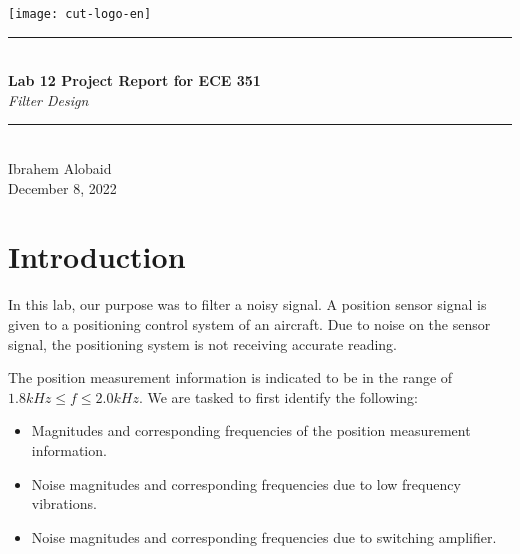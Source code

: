 \documentclass[12pt,a4paper]{article}
\newcommand{\HRule}{\rule{\linewidth}{0.5mm}}
\begin{document}
\begin{titlepage}
\begin{center}
\texttt{[image: cut-logo-en]}~\\[2cm]
\HRule \\[0.4cm]
{ \LARGE 
  \textbf{Lab 12 Project Report for ECE 351}\\[0.4cm]
  \emph{Filter Design}\\[0.4cm]
}
\HRule \\[1.5cm]
{ \large
  Ibrahem Alobaid \\[0.1cm]
  December 8, 2022\\[0.1cm]
}
\vfill

\end{center}
\end{titlepage}
\newpage
\tableofcontents
{}
\newpage
\setcounter{page}{1}
\section{Introduction}\label{sec:intro}

    In this lab, our purpose was to filter a noisy signal. A position sensor signal is given to a positioning control system of an aircraft. Due to noise on the sensor signal, the positioning system is not receiving accurate reading. 
    
    The position measurement information is indicated to be in the range of $1.8kHz \leq f \leq 2.0kHz$. We are tasked to first identify the following:
    
\begin{itemize}
    \item
    Magnitudes and corresponding frequencies of the position measurement information.\\
    
    \item 
    Noise magnitudes and corresponding frequencies due to low frequency vibrations.\\
    
    \item
    Noise magnitudes and corresponding frequencies due to switching amplifier.\\
\end{itemize}
    
\end{document}
